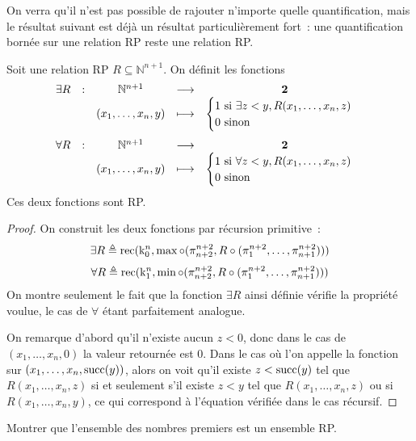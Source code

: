 On verra qu'il n'est pas possible de rajouter n'importe quelle quantification,
mais le résultat suivant est déjà un résultat particulièrement fort~: une
quantification bornée sur une relation RP reste une relation RP.

\begin{proposition}
  Soit une relation RP $R\subseteq \mathbb N^{n+1}$. On définit les fonctions
  \[\begin{array}{ccccc}
  \exists R&:&\mathbb N^{n+1} & \longrightarrow & \boldsymbol{2}\\
  & & (x_1,\ldots,x_n,y) &\longmapsto &
  \begin{cases}
    1 \text{ si } \exists z < y, R(x_1,\ldots,x_n,z)\\
    0 \text{ sinon }
  \end{cases}
  \end{array}\]
  \[\begin{array}{ccccc}
  \forall R & : & \mathbb N^{n+1} & \longrightarrow & \boldsymbol{2}\\
  & & (x_1,\ldots,x_n,y) &\longmapsto &
  \begin{cases}
    1 \text{ si } \forall z < y, R(x_1,\ldots,x_n,z)\\
    0 \text{ sinon }
  \end{cases}
  \end{array}\]
  Ces deux fonctions sont RP.
\end{proposition}

\begin{proof}
  On construit les deux fonctions par récursion primitive~:
  \[\exists R \triangleq \operatorname{rec}(\mathrm k_0^n,\max\circ
  (\pi_{n+2}^{n+2},R\circ(\pi_1^{n+2},\ldots,\pi_{n+1}^{n+2})))\]
  \[\forall R \triangleq \operatorname{rec}(\mathrm k_1^n,\min\circ
  (\pi_{n+2}^{n+2},R\circ(\pi_1^{n+2},\ldots,\pi_{n+1}^{n+2})))\]
  On montre seulement le fait que la fonction $\exists R$ ainsi définie
  vérifie la propriété voulue, le cas de $\forall$ étant parfaitement analogue.

  On remarque d'abord qu'il n'existe aucun $z < 0$, donc dans le cas de
  $(x_1,\ldots,x_n,0)$ la valeur retournée est $0$. Dans le cas où l'on appelle
  la fonction sur $(x_1,\ldots,x_n,\operatorname{succ}(y))$, alors on voit qu'il existe
  $z < \operatorname{succ} (y)$ tel que $R(x_1,\ldots,x_n,z)$ si et seulement s'il existe
  $z < y$ tel que $R(x_1,\ldots,x_n,z)$ ou si $R(x_1,\ldots,x_n,y)$, ce qui
  correspond à l'équation vérifiée dans le cas récursif.
\end{proof}

\begin{exercise}
  Montrer que l'ensemble des nombres premiers est un ensemble RP.
\end{exercise}

